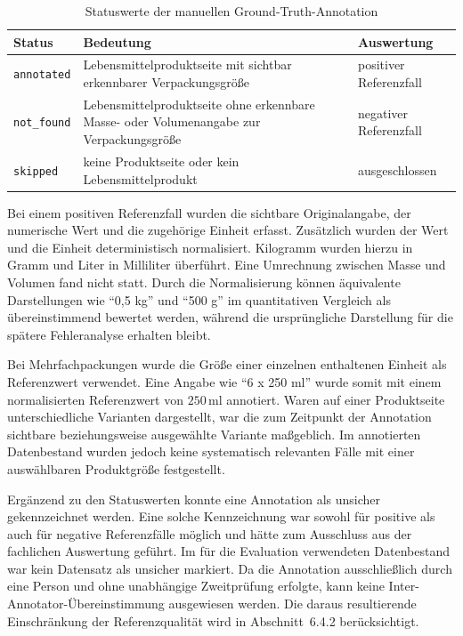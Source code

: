 \begin{table}[htbp]
    \centering
    \small
    \begin{tabular}{p{} p{} p{}}
        \hline
        \textbf{Status} & \textbf{Bedeutung} & \textbf{Auswertung} \\
        \hline
        \texttt{annotated} &
        Lebensmittelproduktseite mit sichtbar erkennbarer Verpackungsgröße &
        positiver Referenzfall \\
        \texttt{not\_found} &
        Lebensmittelproduktseite ohne erkennbare Masse- oder Volumenangabe zur Verpackungsgröße &
        negativer Referenzfall \\
        \texttt{skipped} &
        keine Produktseite oder kein Lebensmittelprodukt &
        ausgeschlossen \\
        \hline
    \end{tabular}
    \caption{Statuswerte der manuellen Ground-Truth-Annotation}
    \label{tab:ground-truth-status}
\end{table}

Bei einem positiven Referenzfall wurden die sichtbare Originalangabe, der numerische Wert und die zugehörige Einheit erfasst. Zusätzlich wurden der Wert und die Einheit deterministisch normalisiert. Kilogramm wurden hierzu in Gramm und Liter in Milliliter überführt. Eine Umrechnung zwischen Masse und Volumen fand nicht statt. Durch die Normalisierung können äquivalente Darstellungen wie \enquote{0,5 kg} und \enquote{500 g} im quantitativen Vergleich als übereinstimmend bewertet werden, während die ursprüngliche Darstellung für die spätere Fehleranalyse erhalten bleibt.

Bei Mehrfachpackungen wurde die Größe einer einzelnen enthaltenen Einheit als Referenzwert verwendet. Eine Angabe wie \enquote{6 x 250 ml} wurde somit mit einem normalisierten Referenzwert von \(250\,\mathrm{ml}\) annotiert. Waren auf einer Produktseite unterschiedliche Varianten dargestellt, war die zum Zeitpunkt der Annotation sichtbare beziehungsweise ausgewählte Variante maßgeblich. Im annotierten Datenbestand wurden jedoch keine systematisch relevanten Fälle mit einer auswählbaren Produktgröße festgestellt.

Ergänzend zu den Statuswerten konnte eine Annotation als unsicher gekennzeichnet werden. Eine solche Kennzeichnung war sowohl für positive als auch für negative Referenzfälle möglich und hätte zum Ausschluss aus der fachlichen Auswertung geführt. Im für die Evaluation verwendeten Datenbestand war kein Datensatz als unsicher markiert. Da die Annotation ausschließlich durch eine Person und ohne unabhängige Zweitprüfung erfolgte, kann keine Inter-Annotator-Übereinstimmung ausgewiesen werden. Die daraus resultierende Einschränkung der Referenzqualität wird in Abschnitt~6.4.2 berücksichtigt.

